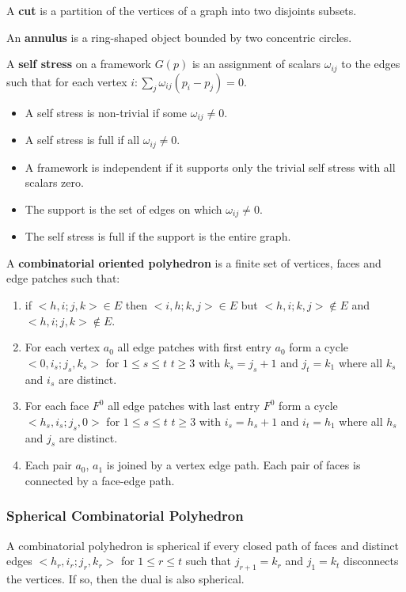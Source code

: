 \documentclass[english]{article}
\begin{document}
A \textbf{cut} is a partition of the vertices of a graph into two disjoints subsets.

An \textbf{annulus} is a ring-shaped object bounded by two concentric circles. 

A \textbf{self stress} on a framework $G(p)$ is an assignment of scalars $\omega_{ij}$ to the edges such that for each vertex $i : \sum_j \omega_{ij}(p_i - p_j) = 0$. 
\begin{itemize}
	\item A self stress is non-trivial if some $\omega_{ij} \neq 0$.
	\item A self stress is full if all $\omega_{ij} \neq 0$.
	\item A framework is independent if it supports only the trivial self stress with all scalars zero.
	\item The support is the set of edges on which $\omega_{ij} \neq 0$.
	\item The self stress is full if the support is the entire graph.
\end{itemize}
A \textbf{combinatorial oriented polyhedron} is a finite set of vertices, faces and edge patches such that:
\begin{enumerate}
	\item if $<h,i;j,k> \in E$ then $<i,h;k,j> \in E$ but $<h,i;k,j> \not\in E$ and $<h,i;j,k> \not\in E$.
	\item For each vertex $a_0$ all edge patches with first entry $a_0$ form a cycle $<0,i_s;j_s,k_s>$ for $1\leq s \leq t$ $t\geq3$ with $k_s = j_s + 1$ and $j_t = k_1$ where all $k_s$ and $i_s$ are distinct. 
	\item For each face $F^0$ all edge patches with last entry $F^0$ form a cycle $<h_s, i_s;j_s,0>$ for $1\leq s \leq t$ $t\geq3$ with $i_s = h_s + 1$ and $i_t = h_1$ where all $h_s$ and $j_s$ are distinct.
	\item Each pair $a_0$, $a_1$ is joined by a vertex edge path. Each pair of faces is connected by a face-edge path. 
\end{enumerate}

\subsubsection{Spherical Combinatorial Polyhedron}
A combinatorial polyhedron is spherical if every closed path of faces and distinct edges $<h_r,i_r;j_r,k_r>$ for $1 \leq r \leq t$ such that $j_{r+1} = k_r$ and $j_1 = k_t$ disconnects the vertices. If so, then the dual is also spherical. 
\end{document}
